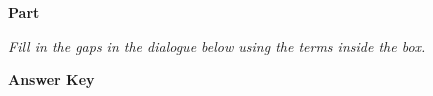 \documentclass[../Exercise.tex]{subfiles}
\begin{document}
\begin{center}
	\large{\textbf{Part }}
\end{center} 

\vspace{5ex}

\noindent \textit{Fill in the gaps in the dialogue below using the terms inside the box.}

\begin{framed}
\end{framed}



\begin{framed}
\textbf{Answer Key}
\begin{multicols*}{4}
\end{multicols*}
\end{framed}

\vspace{7ex}
\end{document}
